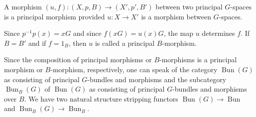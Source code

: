 A morphism $(u, f): (X, p, B) \rightarrow (X', p', B')$ between two principal $G$-spaces is a principal morphism provided $u: X \rightarrow X'$ is a morphism between $G$-spaces.

Since $p^{-1}p(x) = xG$ and since $f(xG) = u(x)G$, the map $u$ determines $f$. If $B = B'$ and if $f = 1_B$, then $u$ is called a principal $B$-morphism.

Since the composition of principal morphisms or $B$-morphisms is a principal morphism or $B$-morphism, respectively, one can speak of the category $\operatorname{Bun}(G)$ as consisting of principal $G$-bundles and morphisms and the subcategory $\operatorname{Bun}_B(G)$ of $\operatorname{Bun}(G)$ as consisting of principal $G$-bundles and morphisms over $B$. We have two natural structure stripping functors $\operatorname{Bun}(G) \rightarrow \operatorname{Bun}$ and $\operatorname{Bun}_B(G) \rightarrow \operatorname{Bun}_B$.
